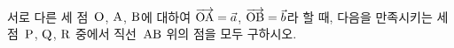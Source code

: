 서로 다른 세 점~$\mathrm{O}$, $\mathrm{A}$, $\mathrm{B}$에 대하여 $\overrightarrow{\mathrm{OA}}=\vec{a}$, $\overrightarrow{\mathrm{OB}}=\vec{b}$라 할 때, 다음을 만족시키는 세 점~$\mathrm{P}$, $\mathrm{Q}$, $\mathrm{R}$ 중에서 직선~$\mathrm{AB}$ 위의 점을 모두 구하시오.  
